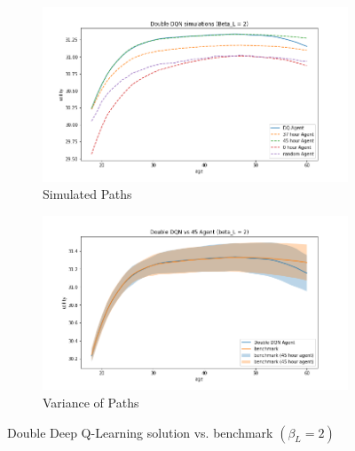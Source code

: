 \begin{figure}[ht]
\begin{subfigure}{.5\textwidth}
  \centering
  \includegraphics[width=1\linewidth]{figures/ddqn_model1_beta_2_solution_benchmark_paths.png}
  \caption{Simulated Paths}
  \label{fig:ddqn_solution_beta2_path}
\end{subfigure}%
\begin{subfigure}{.5\textwidth}
  \centering
  \includegraphics[width=1\linewidth]{figures/ddqn_model1_beta_2_solution_benchmark_variance.png}
  \caption{Variance of Paths}
  \label{fig:ddqn_solution_beta2_var}
\end{subfigure}
    \caption{Double Deep Q-Learning solution vs. benchmark $(\beta_L = 2)$}
    \label{fig:dqn_solution_beta2}
\end{figure}

